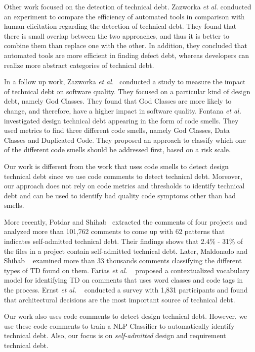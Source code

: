 Other work focused on the detection of technical debt. Zazworka \textit{et al.} \cite{Zazworka2013CSE} conducted an experiment to compare the efficiency of automated tools in comparison with human elicitation regarding the detection of technical debt. They found that there is small overlap between the two approaches, and thus it is better to combine them than replace one with the other. In addition, they concluded that automated tools are more efficient in finding defect debt, whereas developers can realize more abstract categories of technical debt.

In a follow up work, Zazworka \textit{et al.}~\cite{Zazworka2011MTD} conducted a study to measure the impact of technical debt on software quality. They focused on a particular kind of design debt, namely God Classes. They found that God Classes are more likely to change, and therefore, have a higher impact in software quality. Fontana \textit{et al.}~\cite{Fontana2012MTD} investigated design technical debt appearing in the form of code smells. They used metrics to find three different code smells, namely God Classes, Data Classes and Duplicated Code. They proposed an approach to classify which one of the different code smells should be addressed first, based on a risk scale. 

Our work is different from the work that uses code smells to detect design technical debt since we use code comments to detect technical debt. Moreover, our approach does not rely on code metrics and thresholds to identify technical debt and can be used to identify bad quality code symptoms other than bad smells.

More recently, Potdar and Shihab~\cite{Potdar2014ICSME} extracted the comments of four projects and analyzed more than 101,762 comments to come up with 62  patterns that indicates self-admitted technical debt. Their findings shows that 2.4\% - 31\% of the files in a project contain self-admitted technical debt. Later, Maldonado and Shihab ~\cite{Maldonado2015MTD} examined more than 33 thousands comments classifying the different types of TD found on them. Farias \textit{et al.} ~\cite{Farias2015MTD} proposed a contextualized vocabulary model for identifying TD on comments that uses word classes and code tags in the process. Ernst \textit{et al.} ~\cite{Ernst2015FSE} conducted a survey with 1,831 participants and found that architectural decisions are the most important source of technical debt.

Our work also uses code comments to detect design technical debt. However, we use these code comments to train a NLP Classifier to automatically identify technical debt. Also, our focus is on \emph{self-admitted} design and requirement technical debt.


